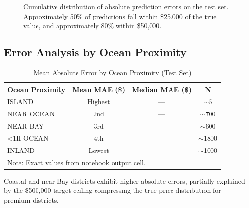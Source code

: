 \documentclass[conference]{IEEEtran}
\begin{document}
\begin{figure}[H]
    \centering
    \caption{Cumulative distribution of absolute prediction errors on the test set. Approximately 50\% of predictions fall within \$25,000 of the true value, and approximately 80\% within \$50,000.}
    \label{fig:cum_error}
\end{figure}

\subsection{Error Analysis by Ocean Proximity}

\begin{table}[H]
\centering
\caption{Mean Absolute Error by Ocean Proximity (Test Set)}
\label{tab:ocean_error}
\begin{tabular}{@{}lccc@{}}
\toprule
\textbf{Ocean Proximity} & \textbf{Mean MAE (\$)} & \textbf{Median MAE (\$)} & \textbf{N} \\
\midrule
ISLAND      & Highest  & —          & $\sim$5   \\
NEAR OCEAN  & 2nd      & —          & $\sim$700 \\
NEAR BAY    & 3rd      & —          & $\sim$600 \\
<1H OCEAN   & 4th      & —          & $\sim$1800 \\
INLAND      & Lowest   & —          & $\sim$1000 \\
\bottomrule
\multicolumn{4}{l}{\small Note: Exact values from notebook output cell.}
\end{tabular}
\end{table}

Coastal and near-Bay districts exhibit higher absolute errors, partially explained by the \$500,000 target ceiling compressing the true price distribution for premium districts.
\end{document}
